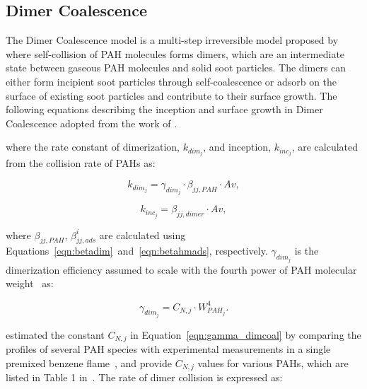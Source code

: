 \subsection{Dimer Coalescence}
The Dimer Coalescence model is a multi-step irreversible model proposed by \citet{blanquart2009joint} where self-collision of PAH molecules forms dimers, which are an intermediate state between gaseous PAH molecules and solid soot particles. The dimers can either form incipient soot particles through self-coalescence or adsorb on the surface of existing soot particles and contribute to their surface growth. The following equations describing the inception and surface growth in Dimer Coalescence adopted from the work of \citet{sun2021modelling}.


\noindent where the rate constant of dimerization, ${k_{dim_{j}}}$, and inception, ${k_{inc_{j}}}$, are calculated from the collision rate of PAHs as:

\begin{equation}
	k_{dim_{j}}=
	\gamma_{dim_j}\cdot\beta_{jj,PAH}\cdot Av
	\label{eqn:kdim_dimcoal},
\end{equation}

\begin{equation}
	k_{inc_{j}}=
	\beta_{jj,dimer}\cdot Av
	\label{eqn:kinc_dimcoal},
\end{equation}

\noindent where $\beta_{jj,PAH}$, $\beta^i_{jj,ads}$ are calculated using Equations~\eqref{eqn:betadim}~and~\eqref{eqn:betahmads}, respectively. $\gamma_{dim_j}$ is the dimerization efficiency assumed to scale with the fourth power of PAH molecular weight~\cite{blanquart2009analyzing} as:

\begin{equation}
	\gamma_{dim_j}=
	C_{N,j}\cdot W_{PAH_j}^4.
	\label{eqn:gamma_dimcoal}
\end{equation} 

\citet{blanquart2009joint} estimated the constant ${C_{N,j}}$ in Equation~\eqref{eqn:gamma_dimcoal} by comparing the profiles of several PAH species with experimental measurements in a single premixed benzene flame~\citep{tregrossi1999combustion}, and provide ${C_{N,j}}$ values for various PAHs, which are listed in Table 1 in~\citep{blanquart2009analyzing}. The rate of dimer collision is expressed as:


